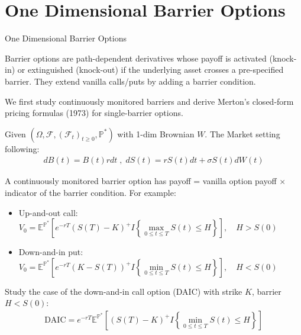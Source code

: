 \documentclass{beamer}
\begin{document}
\section{One Dimensional Barrier Options}
\begin{frame}{One Dimensional Barrier Options}

    {\footnotesize \footnotesize
    \par Barrier options are path-dependent derivatives whose payoff is activated (knock-in) or extinguished (knock-out) 
    if the underlying asset crosses a pre-specified barrier. They extend vanilla 
    calls/puts by adding a barrier condition.\pause
    \par We first study continuously monitored barriers and derive 
    Merton's closed-form pricing formulas (1973) for single-barrier options.\pause
    \par Given $(\Omega, \mathcal{F}, (\mathcal{F}_t)_{t \geq 0}, \mathbb{P}^*)$ with 1-dim Brownian $W$. 
    The Market setting following:
    \begin{align*}
        dB(t) =  B(t) r dt\;,\;dS(t) = r S(t)  dt + \sigma S(t)  dW(t)
    \end{align*}
    \par A continuously monitored barrier option has 
    payoff = vanilla option payoff \(\times\) indicator of the barrier condition. For example: 
    \begin{itemize}
        \item Up-and-out call: $V_0 = \mathbb{E}^{\mathbb{P}^*} \left[ e^{-rT} (S(T) - K)^+ I{\left\{ \max\limits_{0 \leq t \leq T} S(t) \leq H \right\}} \right], \quad H > S(0)$
        \item Down-and-in put: $ V_0 = \mathbb{E}^{\mathbb{P}^*} \left[ e^{-rT} (K - S(T))^+ I{\left\{ \min\limits_{0 \leq t \leq T} S(t) \leq H \right\}} \right], \quad H < S(0)$
    \end{itemize}\pause
     \par Study the case of the down-and-in call option (DAIC) with strike \( K \), barrier \( H < S(0) \):
    \begin{align*}
        \text{DAIC} = e^{-rT}  \mathbb{E}^{\mathbb{P}^* }
        \left[ (S(T) - K)^+ I{\left\{\min\limits_{0 \leq t \leq T} S(t) \leq H \right\}} \right] 
    \end{align*}
    }
    
\end{frame}
\end{document}
